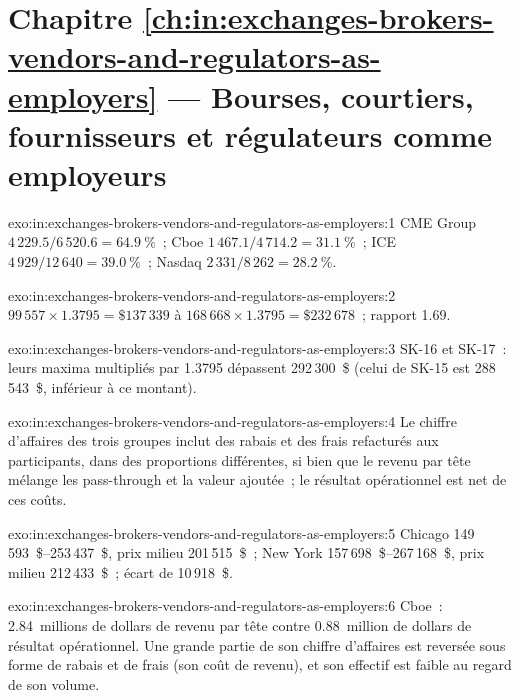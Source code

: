 \section*{Chapitre \ref{ch:in:exchanges-brokers-vendors-and-regulators-as-employers} --- Bourses, courtiers, fournisseurs et régulateurs comme employeurs}

\begin{solution}{exo:in:exchanges-brokers-vendors-and-regulators-as-employers:1}
CME Group $4\,229.5/6\,520.6=64.9~\%$~; Cboe $1\,467.1/4\,714.2=31.1~\%$~; ICE $4\,929/12\,640=39.0~\%$~; Nasdaq
$2\,331/8\,262=28.2~\%$.
\end{solution}

\begin{solution}{exo:in:exchanges-brokers-vendors-and-regulators-as-employers:2}
$99\,557\times1.3795=\$137\,339$ à $168\,668\times1.3795=\$232\,678$~; rapport 1.69.
\end{solution}

\begin{solution}{exo:in:exchanges-brokers-vendors-and-regulators-as-employers:3}
SK-16 et SK-17~: leurs maxima multipliés par 1.3795 dépassent 292\,300~\$ (celui de SK-15 est 288\,543~\$, inférieur à ce montant).
\end{solution}

\begin{solution}{exo:in:exchanges-brokers-vendors-and-regulators-as-employers:4}
Le chiffre d'affaires des trois groupes inclut des rabais et des frais refacturés aux participants, dans des proportions différentes, si bien que le revenu
par tête mélange les pass-through et la valeur ajoutée~; le résultat opérationnel est net de ces coûts.
\end{solution}

\begin{solution}{exo:in:exchanges-brokers-vendors-and-regulators-as-employers:5}
Chicago 149\,593~\$--253\,437~\$, prix milieu 201\,515~\$~; New York 157\,698~\$--267\,168~\$, prix milieu 212\,433~\$~; écart
de 10\,918~\$.
\end{solution}

\begin{solution}{exo:in:exchanges-brokers-vendors-and-regulators-as-employers:6}
Cboe~: 2.84~millions de dollars de revenu par tête contre 0.88~million de dollars de résultat opérationnel. Une grande partie de son chiffre d'affaires est reversée
sous forme de rabais et de frais (son coût de revenu), et son effectif est faible au regard de son volume.
\end{solution}

